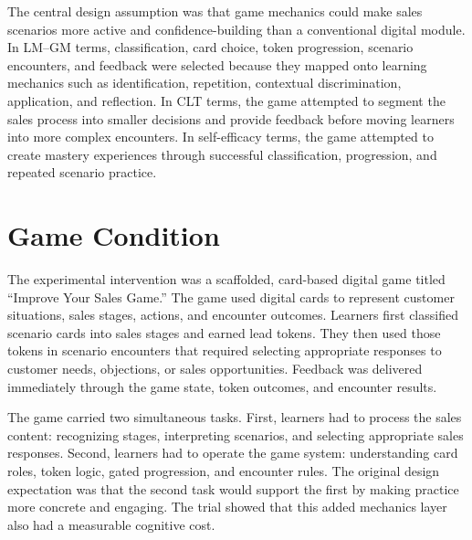 \documentclass[12pt]{report}
\begin{document}
The central design assumption was that game mechanics could make sales scenarios more active and confidence-building than a conventional digital module. In LM--GM terms, classification, card choice, token progression, scenario encounters, and feedback were selected because they mapped onto learning mechanics such as identification, repetition, contextual discrimination, application, and reflection. In CLT terms, the game attempted to segment the sales process into smaller decisions and provide feedback before moving learners into more complex encounters. In self-efficacy terms, the game attempted to create mastery experiences through successful classification, progression, and repeated scenario practice.

\section{Game Condition}
The experimental intervention was a scaffolded, card-based digital game titled ``Improve Your Sales Game.'' The game used digital cards to represent customer situations, sales stages, actions, and encounter outcomes. Learners first classified scenario cards into sales stages and earned lead tokens. They then used those tokens in scenario encounters that required selecting appropriate responses to customer needs, objections, or sales opportunities. Feedback was delivered immediately through the game state, token outcomes, and encounter results.

The game carried two simultaneous tasks. First, learners had to process the sales content: recognizing stages, interpreting scenarios, and selecting appropriate sales responses. Second, learners had to operate the game system: understanding card roles, token logic, gated progression, and encounter rules. The original design expectation was that the second task would support the first by making practice more concrete and engaging. The trial showed that this added mechanics layer also had a measurable cognitive cost.
\end{document}
